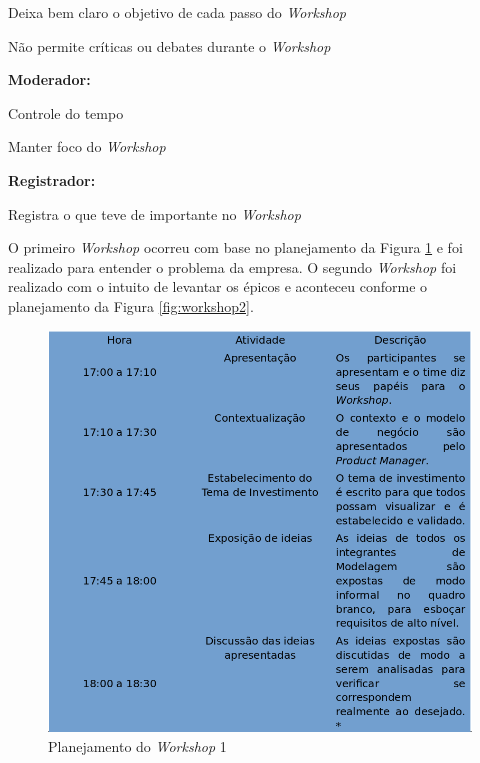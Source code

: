 	Deixa bem claro o objetivo de cada passo do \textit{Workshop}
	
	Não permite críticas ou debates durante o \textit{Workshop}
		
\textbf{Moderador:}

	Controle do tempo
	
	Manter foco do \textit{Workshop}
	
\textbf{Registrador:}

	Registra o que teve de importante no \textit{Workshop}
	
O primeiro \textit{Workshop} ocorreu com base no planejamento da Figura \ref{fig:workshop1} e foi realizado para entender o problema
da empresa. O segundo \textit{Workshop} foi realizado com o intuito de levantar os épicos e aconteceu conforme o planejamento da Figura
\ref{fig:workshop2}.

\begin{figure}[!htb]
\centering
\includegraphics[scale=0.55]{figuras/workshop1.png}
\caption{Planejamento do \textit{Workshop} 1}
\label{fig:workshop1}
\end{figure}

